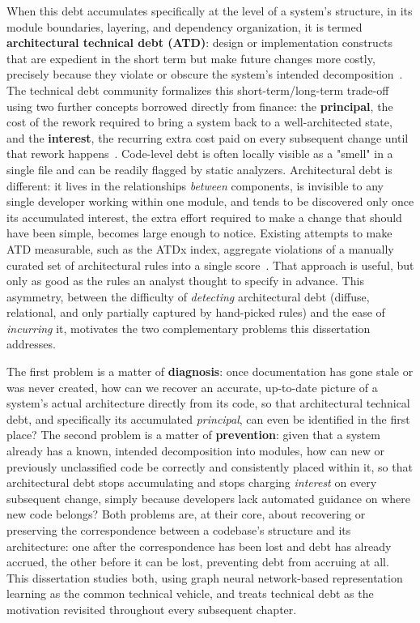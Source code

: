 When this debt accumulates specifically at the level of a system's structure, in its module boundaries, layering, and dependency organization, it is termed \textbf{architectural technical debt (ATD)}: design or implementation constructs that are expedient in the short term but make future changes more costly, precisely because they violate or obscure the system's intended decomposition~\citep{kruchten2012technicaldebt,nord2012metric}. The technical debt community formalizes this short-term/long-term trade-off using two further concepts borrowed directly from finance: the \textbf{principal}, the cost of the rework required to bring a system back to a well-architected state, and the \textbf{interest}, the recurring extra cost paid on every subsequent change until that rework happens~\citep{verdecchia2020grounded}. Code-level debt is often locally visible as a "smell" in a single file and can be readily flagged by static analyzers. Architectural debt is different: it lives in the relationships \emph{between} components, is invisible to any single developer working within one module, and tends to be discovered only once its accumulated interest, the extra effort required to make a change that should have been simple, becomes large enough to notice. Existing attempts to make ATD measurable, such as the ATDx index, aggregate violations of a manually curated set of architectural rules into a single score~\citep{verdecchia2020atdx}. That approach is useful, but only as good as the rules an analyst thought to specify in advance. This asymmetry, between the difficulty of \emph{detecting} architectural debt (diffuse, relational, and only partially captured by hand-picked rules) and the ease of \emph{incurring} it, motivates the two complementary problems this dissertation addresses.

The first problem is a matter of \textbf{diagnosis}: once documentation has gone stale or was never created, how can we recover an accurate, up-to-date picture of a system's actual architecture directly from its code, so that architectural technical debt, and specifically its accumulated \emph{principal}, can even be identified in the first place? The second problem is a matter of \textbf{prevention}: given that a system already has a known, intended decomposition into modules, how can new or previously unclassified code be correctly and consistently placed within it, so that architectural debt stops accumulating and stops charging \emph{interest} on every subsequent change, simply because developers lack automated guidance on where new code belongs? Both problems are, at their core, about recovering or preserving the correspondence between a codebase's structure and its architecture: one after the correspondence has been lost and debt has already accrued, the other before it can be lost, preventing debt from accruing at all. This dissertation studies both, using graph neural network-based representation learning as the common technical vehicle, and treats technical debt as the motivation revisited throughout every subsequent chapter.

